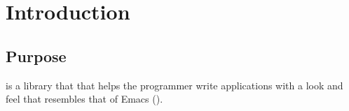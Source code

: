 \chapter{Introduction}
%

\section{Purpose}

\sysname{} is a library that that helps the programmer write
applications with a look and feel that resembles that of Emacs
(\cite{GNUEmacsLispReferenceManual,CraftOfTextEditiing,Finseth:1980:TPTa}).
